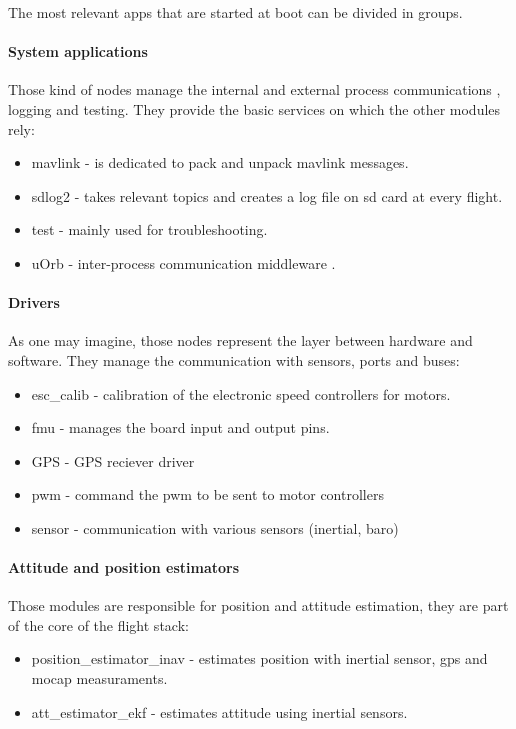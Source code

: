 The most relevant apps that are started at boot can be divided in groups. \\

\noindent
\paragraph{System applications} Those kind of nodes manage the internal and external process communications , logging and testing. They provide the basic services on which the other modules rely:	
\begin{itemize}
	\item mavlink - is dedicated to pack and unpack mavlink messages.
	\item sdlog2 - takes relevant topics and creates a log file on sd card at every flight.
	\item test - mainly used for troubleshooting.
	\item uOrb - inter-process communication middleware .
\end{itemize}
\paragraph{Drivers} As one may imagine, those nodes represent the layer between hardware and software. They manage the communication with sensors, ports and buses:
\begin{itemize}
	\item esc\_calib - calibration of the electronic speed controllers for motors.
	\item fmu - manages the board input and output pins.
	\item GPS - GPS reciever driver
	\item pwm - command the pwm to be sent to motor controllers
	\item sensor - communication with various sensors (inertial, baro)
\end{itemize}
\paragraph{Attitude and position estimators} Those modules are responsible for position and attitude estimation, they are part of the core of the flight stack:
\begin{itemize}
	\item position\_estimator\_inav - estimates position with inertial sensor, gps and mocap measuraments.
	\item att\_estimator\_ekf - estimates attitude using inertial sensors.
\end{itemize}

